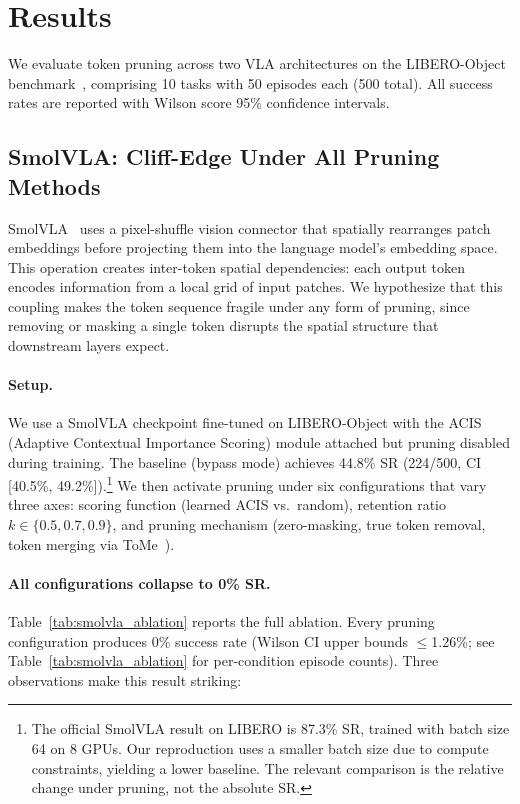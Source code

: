 \section{Results}
\label{sec:results}

We evaluate token pruning across two VLA architectures on the LIBERO-Object benchmark~\cite{liu2023libero}, comprising 10 tasks with 50 episodes each (500 total). All success rates are reported with Wilson score 95\% confidence intervals.

\subsection{SmolVLA: Cliff-Edge Under All Pruning Methods}
\label{sec:smolvla_results}

SmolVLA~\cite{shukor2025smolvla} uses a pixel-shuffle vision connector that spatially rearranges patch embeddings before projecting them into the language model's embedding space. This operation creates inter-token spatial dependencies: each output token encodes information from a local grid of input patches. We hypothesize that this coupling makes the token sequence fragile under any form of pruning, since removing or masking a single token disrupts the spatial structure that downstream layers expect.

\paragraph{Setup.}
We use a SmolVLA checkpoint fine-tuned on LIBERO-Object with the ACIS (Adaptive Contextual Importance Scoring) module attached but pruning disabled during training. The baseline (bypass mode) achieves 44.8\% SR (224/500, CI [40.5\%, 49.2\%]).\footnote{The official SmolVLA result on LIBERO is 87.3\% SR, trained with batch size 64 on 8 GPUs. Our reproduction uses a smaller batch size due to compute constraints, yielding a lower baseline. The relevant comparison is the relative change under pruning, not the absolute SR.} We then activate pruning under six configurations that vary three axes: scoring function (learned ACIS vs.\ random), retention ratio $k \in \{0.5, 0.7, 0.9\}$, and pruning mechanism (zero-masking, true token removal, token merging via ToMe~\cite{bolya2023tome}).

\paragraph{All configurations collapse to 0\% SR.}
Table~\ref{tab:smolvla_ablation} reports the full ablation. Every pruning configuration produces 0\% success rate (Wilson CI upper bounds $\leq$1.26\%; see Table~\ref{tab:smolvla_ablation} for per-condition episode counts). Three observations make this result striking:


